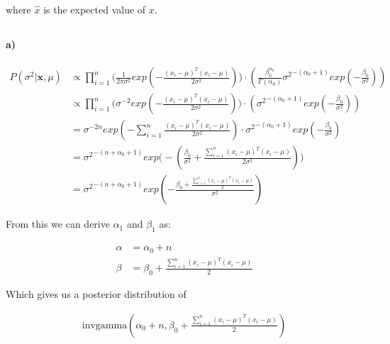 \documentclass{article}
\begin{document}
where $\hat{x}$ is the expected value of $x$.

\subsection{}
\paragraph{a)}

\begin{align*}
  P(\sigma^2 | \mathbf{x}, \mu) &\propto
  \prod_{i = 1}^{n} \Bigg( \frac{1}{2\pi\sigma^2}
    exp{\left( - \frac{(x_i - \mu)^T(x_i - \mu)}{2\sigma^2} \right)} \Bigg) \cdot
    \left( \frac{\beta_{0}^{\alpha_0}}{\Gamma (\alpha_0)}
    {\sigma^2}^{- \left( \alpha_0 + 1 \right)}
    exp \left( - \frac{\beta_0}{\sigma^2} \right) \right) \\
  &\propto \prod_{i = 1}^{n} \Bigg( \sigma^{-2}
    exp{\left( - \frac{(x_i - \mu)^T(x_i - \mu)}{2\sigma^2} \right)} \Bigg) \cdot
    \left( {\sigma^2}^{- \left( \alpha_0 + 1 \right)}
    exp \left( - \frac{\beta_0}{\sigma^2} \right) \right) \\
  &= \sigma^{-2n} exp \left( - \sum_{i = 1}^{n}
    \frac{(x_i - \mu)^T(x_i - \mu)}{2\sigma^2} \right) \cdot
    {\sigma^2}^{- \left( \alpha_0 + 1 \right)}
    exp \left( - \frac{\beta_0}{\sigma^2} \right) \\
  &= {\sigma^2}^{- \left( n + \alpha_0 + 1 \right)}
    exp \Bigg( - \left( \frac{\beta_0}{\sigma^2} + \frac{\sum_{i = 1}^{n}
    (x_i - \mu)^T(x_i - \mu)}{2\sigma^2} \right) \Bigg) \\
  &= {\sigma^2}^{- \left( n + \alpha_0 + 1 \right)}
    exp \left( - \frac{\beta_0 + \frac{\sum_{i = 1}^{n}
    (x_i - \mu)^T(x_i - \mu)}{2}}{\sigma^2} \right)
\end{align*}

From this we can derive $\alpha_1$ and $\beta_1$ as:

\begin{align*}
  \alpha &= \alpha_0 + n \\
  \beta  &= \beta_0 + \frac{\sum_{i = 1}^{n} (x_i - \mu)^T(x_i - \mu)}{2}
\end{align*}

Which gives us a posterior distribution of

\begin{align*}
  \text{invgamma} \left( \alpha_0 + n, \beta_0 +
  \frac{\sum_{i = 1}^{n} (x_i - \mu)^T(x_i - \mu)}{2} \right)
\end{align*}
\end{document}
